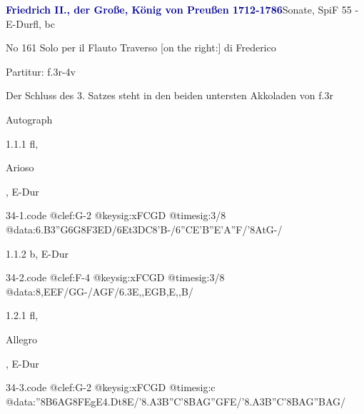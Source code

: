 \documentclass[a4paper, twocolumn, 11pt]{book}
\begin{document}
\par \vspace{16pt} \textcolor{darkblue}{\textbf{Friedrich II., der Große, König von Preußen  1712-1786}}\hfillplus{[34]}\newline Sonate, SpiF 55 - E-Dur\newline fl, bc
\par \begin{itshape} No 161 Solo per il Flauto Traverso [on the right:] di Frederico\end{itshape} 
\par \textcolor{darkblue}{}  Partitur: f.3r-4v\newline \begin{small} Der Schluss des 3. Satzes steht in den beiden untersten Akkoladen von f.3r\end{small} \newline Autograph
\par 1.1.1  fl, \begin{itshape}Arioso\end{itshape}, E-Dur  
\begin{filecontents*}{34-1.code}
@clef:G-2
@keysig:xFCGD
@timesig:3/8
@data:{6.B3''G}{6G8F3ED}/{6Et3DC}8'B-/{6''CE'B''E'A''F}/'8{AtG}-/
\end{filecontents*}
\newline %
\par 1.1.2  b, E-Dur  
\begin{filecontents*}{34-2.code}
@clef:F-4
@keysig:xFCGD
@timesig:3/8
@data:8,{EEF}/{GG}-/{AGF}/{6.3E,,EGB,E,,B}/
\end{filecontents*}
\newline %
\par 1.2.1  fl, \begin{itshape}Allegro\end{itshape}, E-Dur  
\begin{filecontents*}{34-3.code}
@clef:G-2
@keysig:xFCGD
@timesig:c
@data:''{8B6AG}8{FE}gE4.Dt8E/'{8.A3B''C}'{8BA}{G''GFE}/'{8.A3B''C}'{8BA}{G''BAG}/
\end{filecontents*}
\end{document}
